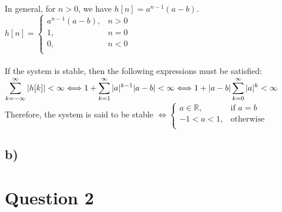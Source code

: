 \documentclass[12pt]{article}
\begin{document}
    In general, for \(n > 0\), we have \(h[n] = a^{n-1}(a-b)\).\\
    \begin{math}
      h[n] = \begin{cases}
        a^{n-1}(a-b),& n>0 \\
        1,& n=0\\
        0,& n<0\\
      \end{cases}
    \end{math}\\ \\
    If the system is stable, then the following expressions must be satisfied: \\
    \begin{math}
      \displaystyle\sum_{k = -\infty}^{\infty}|h[k]| < \infty \Longleftrightarrow 1 + \displaystyle\sum_{k = 1}^{\infty}|a|^{k-1}|a-b| < \infty \Longleftrightarrow 1 + |a-b|\displaystyle\sum_{k = 0}^{\infty}|a|^k < \infty\\ \\ 
    \end{math}
    Therefore, the system is said to be stable \begin{math} \Longleftrightarrow \begin{cases}
        a \in \mathbb{R},& \textrm{if }a=b \\
        -1<a<1,& \textrm{otherwise}\\
      \end{cases} \end{math}
    \subsection*{b)}
    
    
    \section*{Question 2}
\end{document}
